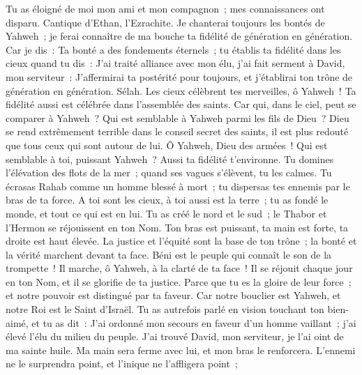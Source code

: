 \begin{multicols}{2}
Tu as éloigné de moi mon ami et mon compagnon~; mes connaissances ont disparu.
\VerseOne{}Cantique d'Ethan, l'Ezrachite.
Je chanterai toujours les bontés de Yahweh~; je ferai connaître de ma bouche ta fidélité de génération en génération.
Car je dis~: Ta bonté a des fondements éternels~; tu établis ta fidélité dans les cieux quand tu dis~:
J'ai traité alliance avec mon élu, j'ai fait serment à David, mon serviteur~:
J'affermirai ta postérité pour toujours, et j'établirai ton trône de génération en génération. Sélah.
Les cieux célèbrent tes merveilles, ô Yahweh~! Ta fidélité aussi est célébrée dans l'assemblée des saints.
Car qui, dans le ciel, peut se comparer à Yahweh~? Qui est semblable à Yahweh parmi les fils de Dieu~?
Dieu se rend extrêmement terrible dans le conseil secret des saints, il est plus redouté que tous ceux qui sont autour de lui.
Ô Yahweh, Dieu des armées~! Qui est semblable à toi, puissant Yahweh~? Aussi ta fidélité t'environne.
Tu domines l'élévation des flots de la mer~; quand ses vagues s'élèvent, tu les calmes.
Tu écrasas Rahab comme un homme blessé à mort~; tu dispersas tes ennemis par le bras de ta force.
A toi sont les cieux, à toi aussi est la terre~; tu as fondé le monde, et tout ce qui est en lui.
Tu as créé le nord et le sud~; le Thabor et l'Hermon se réjouissent en ton Nom.
Ton bras est puissant, ta main est forte, ta droite est haut élevée.
La justice et l'équité sont la base de ton trône~; la bonté et la vérité marchent devant ta face.
Béni est le peuple qui connaît le son de la trompette~! Il marche, ô Yahweh, à la clarté de ta face~!
Il se réjouit chaque jour en ton Nom, et il se glorifie de ta justice.
Parce que tu es la gloire de leur force~; et notre pouvoir est distingué par ta faveur.
Car notre bouclier est Yahweh, et notre Roi est le Saint d'Israël.
Tu as autrefois parlé en vision touchant ton bien-aimé, et tu as dit~: J'ai ordonné mon secours en faveur d'un homme vaillant~; j'ai élevé l'élu du milieu du peuple.
J'ai trouvé David, mon serviteur, je l'ai oint de ma sainte huile.
Ma main sera ferme avec lui, et mon bras le renforcera.
L'ennemi ne le surprendra point, et l'inique ne l'affligera point~;

\end{multicols}
